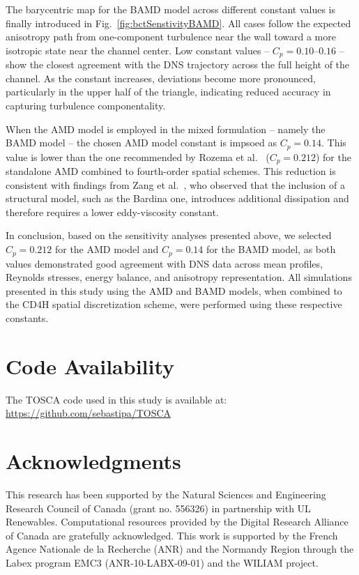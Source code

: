 \documentclass[final,3p]{elsarticle}
\begin{document}
The barycentric map for the BAMD model across different constant values is finally introduced in Fig.~\ref{fig:bctSenstivityBAMD}. All cases follow the expected anisotropy path from one-component turbulence near the wall toward a more isotropic state near the channel center. Low constant values -- $C_p = 0.10$–$0.16$ -- show the closest agreement with the DNS trajectory across the full height of the channel. As the constant increases, deviations become more pronounced, particularly in the upper half of the triangle, indicating reduced accuracy in capturing turbulence componentality. 

When the AMD model is employed in the mixed formulation -- namely the BAMD model -- the chosen AMD model constant is impsoed as $C_p = 0.14$. This value is lower than the one recommended by Rozema et al.~\cite{rozema2015minimum} ($C_p = 0.212$) for the standalone AMD combined to fourth-order spatial schemes. This reduction is consistent with findings from Zang et al.~\cite{zang1993dynamic,streher2021mixed}, who observed that the inclusion of a structural model, such as the Bardina one, introduces additional dissipation and therefore requires a lower eddy-viscosity constant. 

In conclusion, based on the sensitivity analyses presented above, we selected $C_p = 0.212$ for the AMD model and $C_p = 0.14$ for the BAMD model, as both values demonstrated good agreement with DNS data across mean profiles, Reynolds stresses, energy balance, and anisotropy representation. All simulations presented in this study using the AMD and BAMD models, when combined to the CD4H spatial discretization scheme, were performed using these respective constants.

\clearpage
\section*{Code Availability}
The TOSCA code used in this study is available at: \url{https://github.com/sebastipa/TOSCA}
\section*{Acknowledgments}
This research has been supported by the Natural Sciences and Engineering Research Council of Canada (grant no. 556326) in partnership with UL Renewables. Computational resources provided by the Digital Research Alliance of Canada are gratefully acknowledged. This work is supported by the French Agence Nationale de la Recherche (ANR) and the Normandy Region through the Labex program EMC3 (ANR-10-LABX-09-01) and the WILIAM project. 
 


\end{document}
